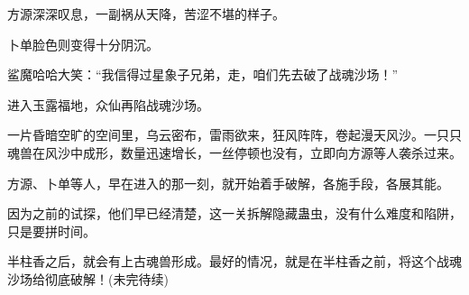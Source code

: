 \begin{this_body}
方源深深叹息，一副祸从天降，苦涩不堪的样子。

卜单脸色则变得十分阴沉。

鲨魔哈哈大笑：“我信得过星象子兄弟，走，咱们先去破了战魂沙场！”

进入玉露福地，众仙再陷战魂沙场。

一片昏暗空旷的空间里，乌云密布，雷雨欲来，狂风阵阵，卷起漫天风沙。一只只魂兽在风沙中成形，数量迅速增长，一丝停顿也没有，立即向方源等人袭杀过来。

方源、卜单等人，早在进入的那一刻，就开始着手破解，各施手段，各展其能。

因为之前的试探，他们早已经清楚，这一关拆解隐藏蛊虫，没有什么难度和陷阱，只是要拼时间。

半柱香之后，就会有上古魂兽形成。最好的情况，就是在半柱香之前，将这个战魂沙场给彻底破解！(未完待续)

\end{this_body}

